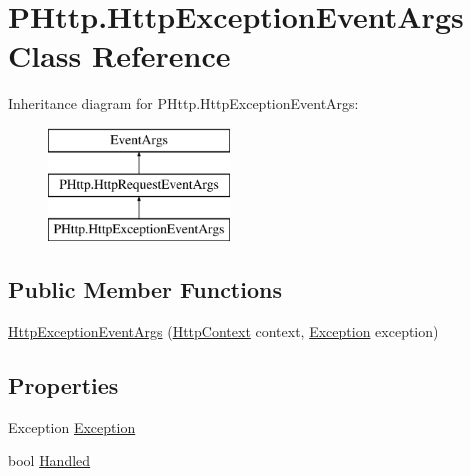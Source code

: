 \hypertarget{class_p_http_1_1_http_exception_event_args}{}\section{P\+Http.\+Http\+Exception\+Event\+Args Class Reference}
\label{class_p_http_1_1_http_exception_event_args}
Inheritance diagram for P\+Http.\+Http\+Exception\+Event\+Args\+:\begin{figure}[H]
\begin{center}
\leavevmode
\includegraphics[height=3.000000cm]{class_p_http_1_1_http_exception_event_args}
\end{center}
\end{figure}
\subsection*{Public Member Functions}
\begin{DoxyCompactItemize}
\item 
\hyperlink{class_p_http_1_1_http_exception_event_args_a61091a6ef34edbed12cac6627392cf22}{Http\+Exception\+Event\+Args} (\hyperlink{class_p_http_1_1_http_context}{Http\+Context} context, \hyperlink{class_p_http_1_1_http_exception_event_args_a33c91813b28c57dbbc37516c0d9df544}{Exception} exception)
\end{DoxyCompactItemize}
\subsection*{Properties}
\begin{DoxyCompactItemize}
\item 
Exception \hyperlink{class_p_http_1_1_http_exception_event_args_a33c91813b28c57dbbc37516c0d9df544}{Exception}
\item 
bool \hyperlink{class_p_http_1_1_http_exception_event_args_ad138d1df1d0d01496abb4bf49e81b6d3}{Handled}
\end{DoxyCompactItemize}


